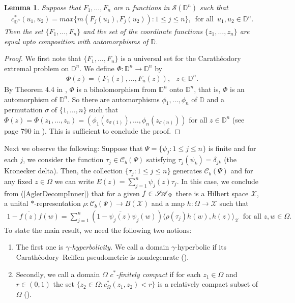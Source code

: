 \documentclass[12pt]{amsart}
\newtheorem{lemma}[theorem]{Lemma}
\theoremstyle{definition}
\numberwithin{equation}{section}
\newcommand{\X}{\mathscr{X}}
\newcommand{\D}{\mathbb{D}}
\newcommand{\SA}{\mathscr{S\mspace{-5mu}A}}
\newcommand{\CB}{\mathcal{C}_b(\Psi)}
\begin{document}
\begin{lemma}\label{Uniqueness_Cara_Ext_Poly}
	Suppose that $F_1,\ldots,F_n$ are $n$ functions in $\mathscr{S}(\D^n)$ such that 
	\begin{align*}
		c^* _{\D^n}(u_1,u_2)=max\{m(F_j (u_1),F_j(u_2)):1\leq j\leq n\},\,\,\,\text{for all}\,\,\,u_1,u_2\in \D^n.
	\end{align*}
	Then the set $\{F_1,\ldots,F_n\}$ and the set of the coordinate functions $\{z_1,\ldots,z_n\}$ are equal upto composition with automorphisms of $\D$.
\end{lemma}
\begin{proof}
	We first note that $\{F_1,\ldots,F_n\}$ is a universal set for the Carath\'eodory extremal problem on $\D^n$. We define $\Phi:\D^n\rightarrow \D^n$ by 
	\begin{align*}
		\Phi(z)=(F_1(z),\ldots, F_n(z)),\,\,\,\ z\in \D^n.
	\end{align*}
	By Theorem 4.4 in \cite{KosinZwoExt}, $\Phi$ is a biholomorphism from $\D^n$ onto $\D^n$, that is, $\Phi$ is an automorphism of $\D^n$. So there are automorphisms $\phi_1,\ldots, \phi_n$ of $\D$ and a permutation $\sigma$ of $\{1,\ldots,n\}$ such that $\Phi(z)=\Phi(z_1,\ldots, z_n)=(\phi_1(z_{\sigma(1)}),\ldots,\phi_n (z_{\sigma(n)}))$ for all $z\in \D^n$ (see page 790 in \cite{J-P-Invariant}). This is sufficient to conclude the proof.
\end{proof}


Next we observe the following: Suppose that $\Psi=\{\psi_j:1\leq j\leq n\}$ is finite and for each $j$, we consider the function $\tau_j\in \CB$ satisfying $\tau_j(\psi_k)=\delta_{jk}$ (the Kronecker delta). Then, the collection $\{\tau_j:1\leq j\leq n\}$ generates $\CB$ and for any fixed $z\in \Omega$ we can write $E(z)=\sum_{j=1}^{n} \psi_j(z)\tau_j$. In this case, we conclude from (\ref{AglerDecompInner}) that for a given $f\in\SA_\Psi$ there is a Hilbert space $\X$, a unital $*$-representation $\rho:\CB\rightarrow B(\X)$ and a map $h:\Omega\rightarrow \X$ such that
\begin{align}\label{AglerDecomp}
	1-\overline{f(z)}f(w)=\sum_{j=1}^{n} (1-\overline{\psi_j(z)}\psi_j(w)) \langle\rho(\tau_j)h(w),h(z)\rangle_\X \,\,\,\text{for all $z,w\in \Omega$.}
\end{align}
To state the main result, we need the following two notions:
\begin{enumerate}
	\item The first one is \textit{$\gamma$-hyperbolicity}. We call a domain  $\gamma$-hyperbolic if its Carath\'eodory–Reiffen pseudometric is nondegenrate (\cite{J-P-Invariant}). 
	\item Secondly, we call a domain $\Omega$ \textit{$c^*$-finitely compact} if for each $z_1\in\Omega$ and $r\in (0,1)$ the set $\{z_2\in \Omega:c_\Omega ^*(z_1,z_2)<r\}$ is a relatively compact subset of $\Omega$ (\cite{KosinZwoExt}).
\end{enumerate}
\end{document}

